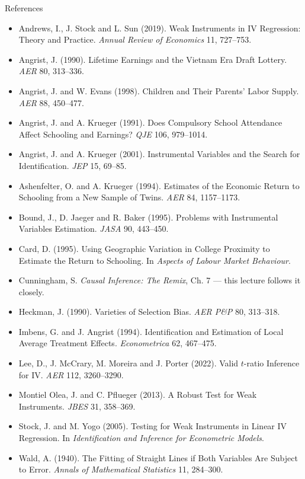 \documentclass[
  11pt,
  ignorenonframetext,
  aspectratio=169,
]{beamer}
\providecommand{\tightlist}{%
  \setlength{\itemsep}{0pt}\setlength{\parskip}{0pt}}
\begin{document}
\begin{frame}{References}
\protect{}\label{references}
\tiny

\begin{itemize}
\tightlist
\item
  Andrews, I., J. Stock and L. Sun (2019). Weak Instruments in IV
  Regression: Theory and Practice. \emph{Annual Review of Economics} 11,
  727--753.
\item
  Angrist, J. (1990). Lifetime Earnings and the Vietnam Era Draft
  Lottery. \emph{AER} 80, 313--336.
\item
  Angrist, J. and W. Evans (1998). Children and Their Parents' Labor
  Supply. \emph{AER} 88, 450--477.
\item
  Angrist, J. and A. Krueger (1991). Does Compulsory School Attendance
  Affect Schooling and Earnings? \emph{QJE} 106, 979--1014.
\item
  Angrist, J. and A. Krueger (2001). Instrumental Variables and the
  Search for Identification. \emph{JEP} 15, 69--85.
\item
  Ashenfelter, O. and A. Krueger (1994). Estimates of the Economic
  Return to Schooling from a New Sample of Twins. \emph{AER} 84,
  1157--1173.
\item
  Bound, J., D. Jaeger and R. Baker (1995). Problems with Instrumental
  Variables Estimation. \emph{JASA} 90, 443--450.
\item
  Card, D. (1995). Using Geographic Variation in College Proximity to
  Estimate the Return to Schooling. In \emph{Aspects of Labour Market
  Behaviour}.
\item
  Cunningham, S. \emph{Causal Inference: The Remix}, Ch. 7 --- this
  lecture follows it closely.
\item
  Heckman, J. (1990). Varieties of Selection Bias. \emph{AER P\&P} 80,
  313--318.
\item
  Imbens, G. and J. Angrist (1994). Identification and Estimation of
  Local Average Treatment Effects. \emph{Econometrica} 62, 467--475.
\item
  Lee, D., J. McCrary, M. Moreira and J. Porter (2022). Valid
  \(t\)-ratio Inference for IV. \emph{AER} 112, 3260--3290.
\item
  Montiel Olea, J. and C. Pflueger (2013). A Robust Test for Weak
  Instruments. \emph{JBES} 31, 358--369.
\item
  Stock, J. and M. Yogo (2005). Testing for Weak Instruments in Linear
  IV Regression. In \emph{Identification and Inference for Econometric
  Models}.
\item
  Wald, A. (1940). The Fitting of Straight Lines if Both Variables Are
  Subject to Error. \emph{Annals of Mathematical Statistics} 11,
  284--300.
\end{itemize}
\end{frame}
\end{document}
